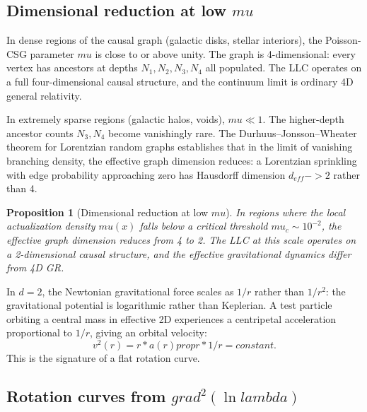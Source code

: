 \documentclass[11pt]{article}
\def\mu{mu}%
\def\lambda{lambda}%
\def\mathrm#1{#1}%
\def\text#1{#1}%
\def\frac#1#2{#1/#2}%
\def\cdot{*}%
\def\to{->}%
\def\nabla{grad}%
\def\propto{prop}%
\newtheorem{proposition}{Proposition}
\begin{document}
\subsection{Dimensional reduction at low $\mu$}
\label{sec:dim_reduction}

In dense regions of the causal graph (galactic disks, stellar interiors), the Poisson-CSG parameter $\mu$ is close to or above unity. The graph is 4-dimensional: every vertex has ancestors at depths $N_1, N_2, N_3, N_4$ all populated. The LLC operates on a full four-dimensional causal structure, and the continuum limit is ordinary 4D general relativity.

In extremely sparse regions (galactic halos, voids), $\mu \ll 1$. The higher-depth ancestor counts $N_3, N_4$ become vanishingly rare. The Durhuus--Jonsson--Wheater theorem for Lorentzian random graphs establishes that in the limit of vanishing branching density, the effective graph dimension reduces: a Lorentzian sprinkling with edge probability approaching zero has Hausdorff dimension $d_{\mathrm{eff}} \to 2$ rather than 4.

\begin{proposition}[Dimensional reduction at low $\mu$]
\label{prop:dim_reduction}
In regions where the local actualization density $\mu(x)$ falls below a critical threshold $\mu_c \sim 10^{-2}$, the effective graph dimension reduces from 4 to 2. The LLC at this scale operates on a 2-dimensional causal structure, and the effective gravitational dynamics differ from 4D GR.
\end{proposition}

In $d=2$, the Newtonian gravitational force scales as $1/r$ rather than $1/r^2$: the gravitational potential is logarithmic rather than Keplerian. A test particle orbiting a central mass in effective 2D experiences a centripetal acceleration proportional to $1/r$, giving an orbital velocity:
\begin{equation}
v^2(r) = r \cdot a(r) \propto r \cdot \frac{1}{r} = \text{constant}.
\end{equation}
This is the signature of a flat rotation curve.

\subsection{Rotation curves from $\nabla^2(\ln\lambda)$}
\label{sec:rotation_curves}
\end{document}
